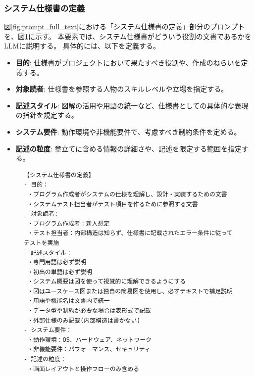 \subsubsection{システム仕様書の定義}

図\ref{fig:prompt_full_text}における「システム仕様書の定義」部分のプロンプトを、図\ref{fig:definition_of_system_specification}に示す。
本要素では、システム仕様書がどういう役割の文書であるかをLLMに説明する。
具体的には、以下を定義する。
\begin{itemize}
  \item \textbf{目的}: 仕様書がプロジェクトにおいて果たすべき役割や、作成のねらいを定義する。
  \item \textbf{対象読者}: 仕様書を参照する人物のスキルレベルや立場を指定する。
  \item \textbf{記述スタイル}: 図解の活用や用語の統一など、仕様書としての具体的な表現の指針を規定する。
  \item \textbf{システム要件}: 動作環境や非機能要件で、考慮すべき制約条件を定める。
  \item \textbf{記述の粒度}: 章立てに含める情報の詳細さや、記述を限定する範囲を指定する。
\end{itemize}


\begin{figure}[tp]
\begin{tcolorbox}[
  colback=white,
  colframe=blue,
  fonttitle=\bfseries,
]
\footnotesize
\ttfamily
\fontsize{10}{11}\selectfont
\begin{verbatim}
【システム仕様書の定義】
- 目的：
 ・プログラム作成者がシステムの仕様を理解し、設計・実装するための文書 
 ・システムテスト担当者がテスト項目を作るために参照する文書
- 対象読者:
 ・プログラム作成者：新人想定 
 ・テスト担当者：内部構造は知らず、仕様書に記載されたエラー条件に従ってテストを実施
- 記述スタイル：
 ・専門用語は必ず説明 
 ・初出の単語は必ず説明 
 ・システム概要は図を使って視覚的に理解できるようにする 
 ・図はユースケース図または独自の簡易図を使用し、必ずテキストで補足説明 
 ・用語や機能名は文書内で統一 
 ・データ型や制約が必要な場合は表形式で記載 
 ・外部仕様のみ記載(内部構造は書かない)
- システム要件：
 ・動作環境：OS、ハードウェア、ネットワーク 
 ・非機能要件：パフォーマンス、セキュリティ 
- 記述の粒度：
 ・画面レイアウトと操作フローのみ含める
\end{verbatim}
\end{tcolorbox}
\par\vspace{-20pt}
\label{fig:definition_of_system_specification}
\end{figure}

